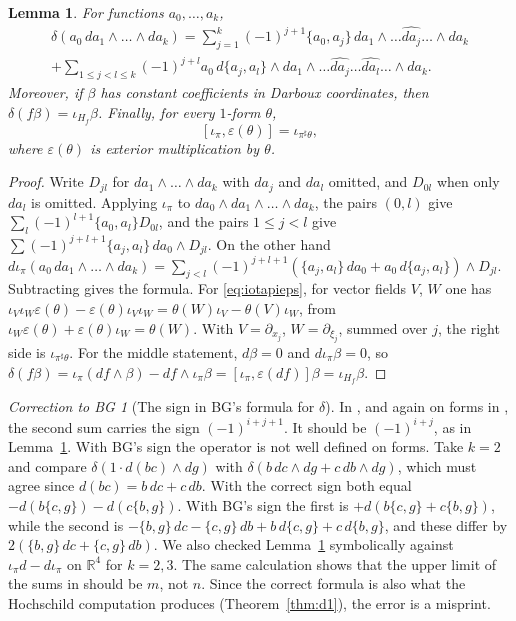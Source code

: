 \documentclass[11pt,oneside,reqno]{article}
\newcommand{\R}{\mathbb R}
\newcommand{\eps}{\varepsilon}
\newcommand{\pa}{\partial}
\theoremstyle{plain}
\newtheorem{lemma}[theorem]{Lemma}
\theoremstyle{definition}
\theoremstyle{remark}
\newtheorem{correction}[theorem]{Correction to BG}
\begin{document}
\begin{lemma}\label{lem:deltaformula}
For functions \(a_0,\dots,a_k\),
\begin{multline*}
 \delta(a_0\,da_1\wedge\dots\wedge da_k)=\sum_{j=1}^k(-1)^{j+1}\{a_0,a_j\}\,
 da_1\wedge\dots\widehat{da_j}\dots\wedge da_k\\
 +\sum_{1\le j<l\le k}(-1)^{j+l}a_0\,d\{a_j,a_l\}\wedge da_1\wedge\dots
 \widehat{da_j}\dots\widehat{da_l}\dots\wedge da_k .
\end{multline*}
Moreover, if \(\beta\) has constant coefficients in Darboux coordinates, then
\(\delta(f\beta)=\iota_{H_f}\beta\). Finally, for every \(1\)-form \(\theta\),
\begin{equation}\label{eq:iotapieps}
 [\iota_\pi,\eps(\theta)]=\iota_{\pi^\sharp\theta},
\end{equation}
where \(\eps(\theta)\) is exterior multiplication by \(\theta\).
\end{lemma}

\begin{proof}
Write \(D_{jl}\) for \(da_1\wedge\dots\wedge da_k\) with \(da_j\) and \(da_l\) omitted,
and \(D_{0l}\) when only \(da_l\) is omitted. Applying \(\iota_\pi\) to
\(da_0\wedge da_1\wedge\dots\wedge da_k\), the pairs \((0,l)\) give
\(\sum_l(-1)^{l+1}\{a_0,a_l\}D_{0l}\), and the pairs \(1\le j<l\) give
\(\sum(-1)^{j+l+1}\{a_j,a_l\}\,da_0\wedge D_{jl}\). On the other hand
\(d\iota_\pi(a_0\,da_1\wedge\dots\wedge da_k)=\sum_{j<l}(-1)^{j+l+1}
(\{a_j,a_l\}\,da_0+a_0\,d\{a_j,a_l\})\wedge D_{jl}\). Subtracting gives the
formula. For \eqref{eq:iotapieps}, for vector fields \(V\), \(W\) one has
\(\iota_V\iota_W\eps(\theta)-\eps(\theta)\iota_V\iota_W=\theta(W)\iota_V-\theta(V)\iota_W\), from
\(\iota_W\eps(\theta)+\eps(\theta)\iota_W=\theta(W)\). With \(V=\pa_{x_j}\), \(W=\pa_{\xi_j}\),
summed over \(j\), the right side is \(\iota_{\pi^\sharp\theta}\). For the middle
statement, \(d\beta=0\) and \(d\iota_\pi\beta=0\), so \(\delta(f\beta)=\iota_\pi(df\wedge\beta)-
df\wedge\iota_\pi\beta=[\iota_\pi,\eps(df)]\beta=\iota_{H_f}\beta\).
\end{proof}

\begin{correction}[The sign in BG's formula for \(\delta\)]\label{corr:delta}
In \cite[\S1, Theorem~(2)]{BG}, and again on forms in \cite[\S2]{BG}, the
second sum carries the sign \((-1)^{i+j+1}\). It should be \((-1)^{i+j}\), as in
Lemma~\ref{lem:deltaformula}. With BG's sign the operator is not well defined
on forms. Take \(k=2\) and compare \(\delta(1\cdot d(bc)\wedge dg)\) with
\(\delta(b\,dc\wedge dg+c\,db\wedge dg)\), which must agree since
\(d(bc)=b\,dc+c\,db\). With the correct sign both equal
\(-d(b\{c,g\})-d(c\{b,g\})\). With BG's sign the first is
\(+d(b\{c,g\}+c\{b,g\})\), while the second is
\(-\{b,g\}\,dc-\{c,g\}\,db+b\,d\{c,g\}+c\,d\{b,g\}\), and these differ by
\(2(\{b,g\}\,dc+\{c,g\}\,db)\). We also checked Lemma~\ref{lem:deltaformula}
symbolically against \(\iota_\pi d-d\iota_\pi\) on \(\R^4\) for \(k=2,3\). The same
calculation shows that the upper limit of the sums in \cite[\S2]{BG} should
be \(m\), not \(n\). Since the correct formula is also what the Hochschild
computation produces (Theorem~\ref{thm:d1}), the error is a misprint.
\end{correction}
\end{document}
